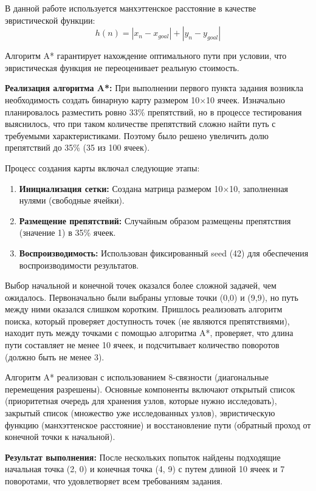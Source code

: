В данной работе используется манхэттенское расстояние в качестве эвристической функции:
$$h(n) = |x_n - x_{goal}| + |y_n - y_{goal}|$$

Алгоритм A* гарантирует нахождение оптимального пути при условии, что эвристическая функция не переоценивает реальную стоимость.

\textbf{Реализация алгоритма A*:} При выполнении первого пункта задания возникла необходимость создать бинарную карту размером 10×10 ячеек. Изначально планировалось разместить ровно 33\% препятствий, но в процессе тестирования выяснилось, что при таком количестве препятствий сложно найти путь с требуемыми характеристиками. Поэтому было решено увеличить долю препятствий до 35\% (35 из 100 ячеек).

Процесс создания карты включал следующие этапы:
\begin{enumerate}
\item \textbf{Инициализация сетки:} Создана матрица размером 10×10, заполненная нулями (свободные ячейки).
\item \textbf{Размещение препятствий:} Случайным образом размещены препятствия (значение 1) в 35\% ячеек.
\item \textbf{Воспроизводимость:} Использован фиксированный seed (42) для обеспечения воспроизводимости результатов.
\end{enumerate}

Выбор начальной и конечной точек оказался более сложной задачей, чем ожидалось. Первоначально были выбраны угловые точки (0,0) и (9,9), но путь между ними оказался слишком коротким. Пришлось реализовать алгоритм поиска, который проверяет доступность точек (не являются препятствиями), находит путь между точками с помощью алгоритма A*, проверяет, что длина пути составляет не менее 10 ячеек, и подсчитывает количество поворотов (должно быть не менее 3).

Алгоритм A* реализован с использованием 8-связности (диагональные перемещения разрешены). Основные компоненты включают открытый список (приоритетная очередь для хранения узлов, которые нужно исследовать), закрытый список (множество уже исследованных узлов), эвристическую функцию (манхэттенское расстояние) и восстановление пути (обратный проход от конечной точки к начальной).

\textbf{Результат выполнения:} После нескольких попыток найдены подходящие начальная точка (2, 0) и конечная точка (4, 9) с путем длиной 10 ячеек и 7 поворотами, что удовлетворяет всем требованиям задания.

